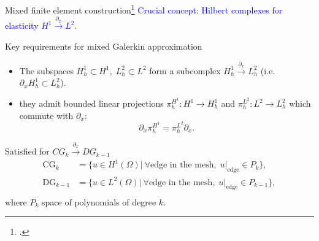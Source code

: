 \documentclass[aspectratio=169]{beamer}
\begin{document}
\begin{frame}{Mixed finite element construction\footcite{arnold2006acta}}
	\textcolor{blue}{Crucial concept: Hilbert complexes for elasticity $H^1 \xrightarrow{\partial_x} L^2$.} \\
	\begin{block}{Key requirements for mixed Galerkin approximation}
		
	\begin{itemize}
		\item The subspaces $H^1_h \subset H^1, \; L^2_h \subset L^2$ form a subcomplex $H^1_h \xrightarrow{\partial_x} L^2_h$ \hspace{1cm}(i.e. $\partial_x H^1_h \subset L^2_h$).
		\item they admit bounded linear projections $\pi_h^{H^1}: H^1 \rightarrow  
		H^1_h$  and $\pi_h^{L^2}: L^2 \rightarrow  
		L^2_h$ which commute with $\partial_x$:
		\vspace*{-\baselineskip}\vspace*{3pt}
		\[\partial_x \pi_h^{H^1} = \pi_h^{L^2} \partial_x.\]
	\end{itemize}
	\end{block}

	Satisfied for $CG_k \xrightarrow{\partial_x} DG_{k-1}$ 
	\begin{equation*}
		\begin{aligned}
			\mathrm{CG}_k &= \{u \in H^1(\Omega) | \: \forall \text{edge in the mesh}, \; u|_{\text{edge}} \in P_k\}, \\
			\mathrm{DG}_{k-1} &= \{u \in L^2(\Omega) | \: \forall \text{edge in the mesh}, \; u|_{\text{edge}} \in P_{k-1}\}, \\
		\end{aligned}
	\end{equation*}
	where $P_k$ space of polynomials of degree $k$.
	\vspace{.1cm}
\end{frame}
\end{document}
